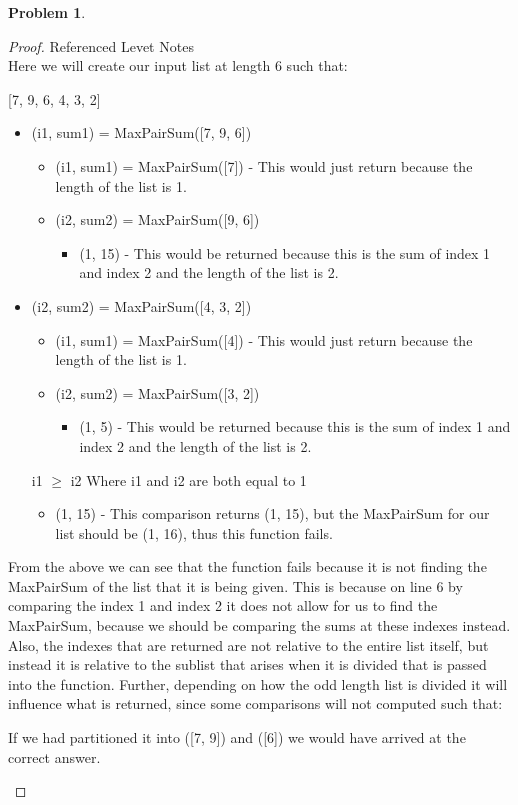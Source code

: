 \documentclass[11pt]{article}
\theoremstyle{definition}
\theoremstyle{definition}
\newtheorem{required}{Problem}
\theoremstyle{definition}
\begin{document}
\begin{required}
\begin{proof} Referenced Levet Notes\\ 
Here we will create our input list at length 6 such that: \\
\begin{center}
[7, 9, 6, 4, 3, 2]
\end{center}
\begin{itemize}
\item (i1, sum1) = MaxPairSum([7, 9, 6])
\begin{itemize}
\item (i1, sum1) = MaxPairSum([7]) - This would just return because the length of the list is 1.
\item (i2, sum2) = MaxPairSum([9, 6])
\begin{itemize}
\item (1, 15) - This would be returned because this is the sum of index 1 and index 2 and the length of the list is 2.
\end{itemize}
\end{itemize}
\item(i2, sum2) = MaxPairSum([4, 3, 2])
\begin{itemize}
\item (i1, sum1) = MaxPairSum([4])  - This would just return because the length of the list is 1.
\item (i2, sum2) = MaxPairSum([3, 2])
\begin{itemize}
\item (1, 5) - This would be returned because this is the sum of index 1 and index 2 and the length of the list is 2.
\end{itemize}
\end{itemize}
i1 $\geq$ i2 Where i1 and i2 are both equal to 1 
\begin{itemize}
\item (1, 15) - This comparison returns (1, 15), but the MaxPairSum for our list should be (1, 16), thus this function fails.
\end{itemize}
\end{itemize}
From the above we can see that the function fails because it is not finding the MaxPairSum of the list that it is being given. This is because on line 6 by comparing the index 1 and index 2 it does not allow for us to find the MaxPairSum, because we should be comparing the sums at these indexes instead. \\

Also, the indexes that are returned are not relative to the entire list itself, but instead it is relative to the sublist that arises when it is divided that is passed into the function. Further, depending on how the odd length list is divided it will influence what is returned, since some comparisons will not computed such that: \\
\begin{center}
If we had partitioned it into ([7, 9]) and ([6]) we would have arrived at the correct answer.
\end{center}
\end{proof}
\end{required}



\end{document}
